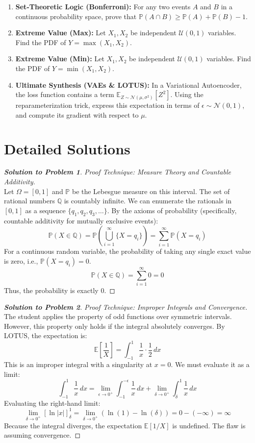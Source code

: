 \documentclass[11pt, a4paper]{article}
\theoremstyle{definition}
\theoremstyle{remark}
\newcommand{\Q}{\mathbb{Q}}
\newcommand{\E}{\mathbb{E}}
\newcommand{\Prob}{\mathbb{P}}
\begin{document}
\begin{enumerate}[label=\textbf{\arabic*.}, leftmargin=*]
    \item \textbf{Set-Theoretic Logic (Bonferroni):} For any two events $A$ and $B$ in a continuous probability space, prove that $\Prob(A \cap B) \geq \Prob(A) + \Prob(B) - 1$.
    \item \textbf{Extreme Value (Max):} Let $X_1, X_2$ be independent $\mathcal{U}(0, 1)$ variables. Find the PDF of $Y = \max(X_1, X_2)$.
    \item \textbf{Extreme Value (Min):} Let $X_1, X_2$ be independent $\mathcal{U}(0, 1)$ variables. Find the PDF of $Y = \min(X_1, X_2)$.
    \item \textbf{Ultimate Synthesis (VAEs \& LOTUS):} In a Variational Autoencoder, the loss function contains a term $\E_{Z \sim \mathcal{N}(\mu, \sigma^2)}[Z^2]$. Using the reparameterization trick, express this expectation in terms of $\epsilon \sim \mathcal{N}(0, 1)$, and compute its gradient with respect to $\mu$.
\end{enumerate}

\newpage

\section{Detailed Solutions}

\begin{proof}[\textbf{Solution to Problem 1}]
\textit{Proof Technique: Measure Theory and Countable Additivity.} \\
Let $\Omega = [0, 1]$ and $\Prob$ be the Lebesgue measure on this interval. The set of rational numbers $\Q$ is countably infinite. We can enumerate the rationals in $[0, 1]$ as a sequence $\{q_1, q_2, q_3, \dots\}$. 
By the axioms of probability (specifically, countable additivity for mutually exclusive events):
\[ \Prob(X \in \Q) = \Prob\left(\bigcup_{i=1}^{\infty} \{X = q_i\}\right) = \sum_{i=1}^{\infty} \Prob(X = q_i) \]
For a continuous random variable, the probability of taking any single exact value is zero, i.e., $\Prob(X = q_i) = 0$.
\[ \Prob(X \in \Q) = \sum_{i=1}^{\infty} 0 = 0 \]
Thus, the probability is exactly $0$.
\end{proof}

\begin{proof}[\textbf{Solution to Problem 2}]
\textit{Proof Technique: Improper Integrals and Convergence.} \\
The student applies the property of odd functions over symmetric intervals. However, this property only holds if the integral absolutely converges. By LOTUS, the expectation is:
\[ \E\left[\frac{1}{X}\right] = \int_{-1}^{1} \frac{1}{x} \cdot \frac{1}{2} \, dx \]
This is an improper integral with a singularity at $x = 0$. We must evaluate it as a limit:
\[ \int_{-1}^{1} \frac{1}{x} \, dx = \lim_{\epsilon \to 0^+} \int_{-1}^{-\epsilon} \frac{1}{x} \, dx + \lim_{\delta \to 0^+} \int_{\delta}^{1} \frac{1}{x} \, dx \]
Evaluating the right-hand limit:
\[ \lim_{\delta \to 0^+} [\ln|x|]_{\delta}^{1} = \lim_{\delta \to 0^+} (\ln(1) - \ln(\delta)) = 0 - (-\infty) = \infty \]
Because the integral diverges, the expectation $\E[1/X]$ is undefined. The flaw is assuming convergence.
\end{proof}
\end{document}

